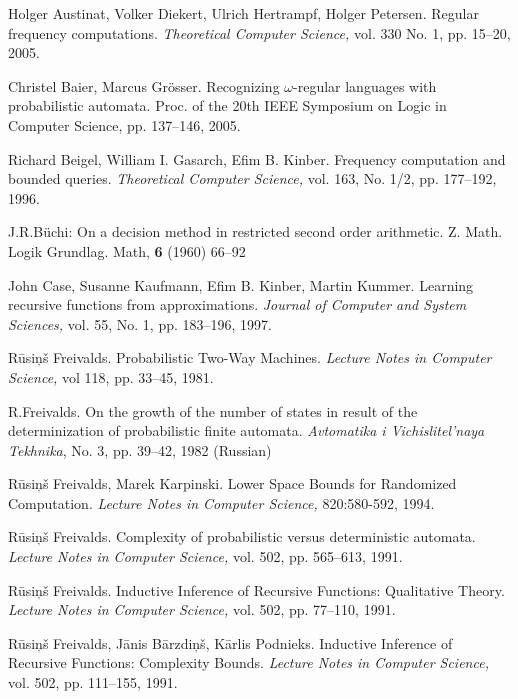 \documentclass{llncs}
\begin{document}
\begin{thebibliography}{99}

Holger Austinat, Volker Diekert, Ulrich Hertrampf, Holger Petersen.
Regular frequency computations.
{\em Theoretical Computer Science,} vol. 330 No. 1, pp. 15--20, 2005.

Christel Baier, Marcus Gr\" osser.
Recognizing $\omega$-regular languages with probabilistic automata.
Proc. of the 20th IEEE Symposium on Logic in Computer Science, pp. 137--146, 2005.



Richard Beigel, William I. Gasarch, Efim B. Kinber.
Frequency computation and bounded queries.
{\em Theoretical Computer Science,} vol. 163, No. 1/2, pp. 177--192, 1996. 

%
J.R.B\"uchi:
On a decision method in restricted second order arithmetic. 
Z. Math. Logik Grundlag. Math, {\bf 6} (1960) 66--92
%

John Case, Susanne Kaufmann, Efim B. Kinber,  Martin Kummer.
Learning recursive functions from approximations.
{\em Journal of Computer and System Sciences,} vol. 55, No. 1, pp. 183--196, 1997. 

R\= usi\c n\v s Freivalds.
Probabilistic Two-Way Machines.
{\em Lecture Notes in Computer Science,} vol 118, pp. 33--45, 1981. 

\iffalse

R.Freivalds.
On the growth of the number of states in result of the determinization of probabilistic finite automata.
\textit{Avtomatika i Vichislitel'naya Tekhnika}, No. 3, pp. 39--42, 1982 (Russian)


R\= usi\c n\v s Freivalds, Marek Karpinski. 
Lower Space Bounds for Randomized Computation. 
{\em Lecture Notes in Computer Science,} 820:580-592, 1994. 



R\= usi\c n\v s Freivalds.
Complexity of probabilistic versus deterministic automata. 
{\em Lecture Notes in Computer Science,} vol. 502, pp. 565--613, 1991.


R\= usi\c n\v s Freivalds.
Inductive Inference of Recursive Functions: Qualitative Theory.
{\em Lecture Notes in Computer Science,} vol. 502, pp. 77--110, 1991.

R\= usi\c n\v s Freivalds, J\= anis B\= arzdi\c n\v s, K\= arlis Podnieks. 
Inductive Inference of Recursive Functions: Complexity Bounds.
{\em Lecture Notes in Computer Science,} vol. 502, pp. 111--155, 1991.



\end{thebibliography}
\end{document}

